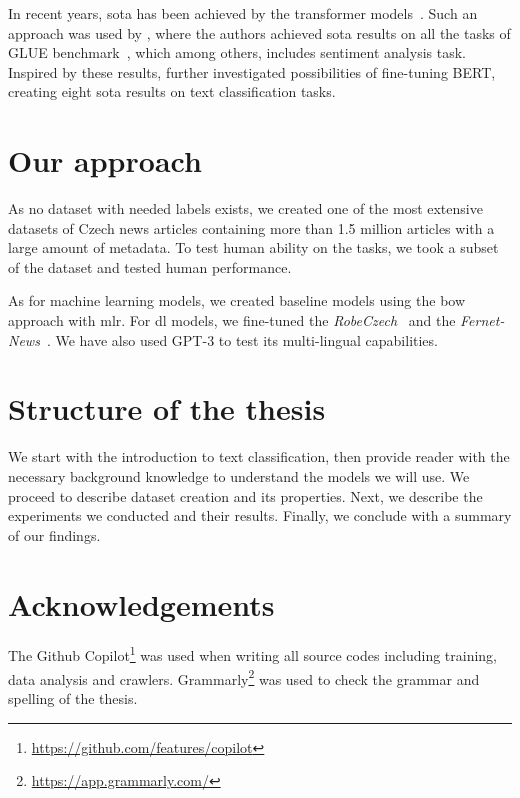 In recent years, \ac{sota} has been achieved by the transformer models~\parencite[see][]{vaswaniAttentionAllYou2017d}.
Such an approach was used by \textcite{devlinBERTPretrainingDeep2019a}, where the authors achieved \ac{sota} results on
all the tasks of GLUE benchmark~\parencite{wangGLUEMultiTaskBenchmark2019}, which among others, includes 
sentiment analysis task. Inspired by these results, \textcite{sunHowFineTuneBERT2020} further investigated possibilities
of fine-tuning BERT, creating eight \ac{sota} results on text classification tasks.

\section*{Our approach}
As no dataset with needed labels exists, we created one of the most extensive datasets of Czech news articles
containing more than 1.5 million articles with a large amount of metadata.
To test human ability on the tasks, we took a subset of the dataset and tested human performance.

As for machine learning models, we created baseline models using the \acl{bow} approach with \acl{mlr}.
For \ac{dl} models, we fine-tuned the \textit{RobeCzech}~\parencite{strakaRobeCzechCzechRoBERTa2021}
and the \textit{Fernet-News}~\parencite{leheckaComparisonCzechTransformers2021}. 
We have also used GPT-3 \parencite{brownLanguageModelsAre2020b} to test its multi-lingual capabilities.

\section*{Structure of the thesis}
We start with the introduction to text classification, then provide reader with the necessary background knowledge
to understand the models we will use. We proceed to describe dataset creation and its properties.
Next, we describe the experiments we conducted and their results. Finally, we conclude with a summary of our findings.

\section*{Acknowledgements}
The Github Copilot\footnote{\url{https://github.com/features/copilot}}
was used when writing all source codes including training, data analysis and crawlers.
Grammarly\footnote{\url{https://app.grammarly.com/}} was used to check the grammar and spelling of the thesis.
